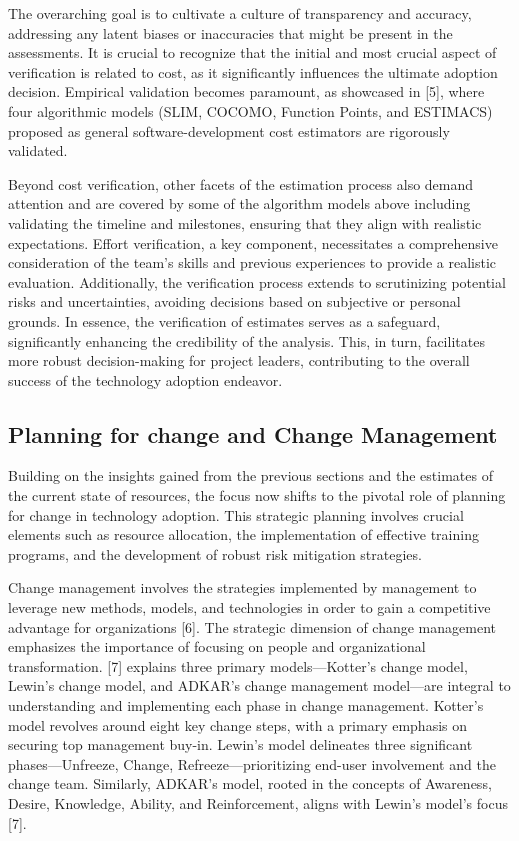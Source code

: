 \documentclass{article}
\begin{document}
\noindent The overarching goal is to cultivate a culture of transparency and accuracy, addressing any latent biases or inaccuracies that might be present in the assessments. It is crucial to recognize that the initial and most crucial aspect of verification is related to cost, as it significantly influences the ultimate adoption decision. Empirical validation becomes paramount, as showcased in [5], where four algorithmic models (SLIM, COCOMO, Function Points, and ESTIMACS) proposed as general software-development cost estimators are rigorously validated.\newline

\noindent Beyond cost verification, other facets of the estimation process also demand attention and are covered by some of the algorithm models above including validating the timeline and milestones, ensuring that they align with realistic expectations. Effort verification, a key component, necessitates a comprehensive consideration of the team's skills and previous experiences to provide a realistic evaluation. Additionally, the verification process extends to scrutinizing potential risks and uncertainties, avoiding decisions based on subjective or personal grounds. In essence, the verification of estimates serves as a safeguard, significantly enhancing the credibility of the analysis. This, in turn, facilitates more robust decision-making for project leaders, contributing to the overall success of the technology adoption endeavor.

\subsection{Planning for change and Change Management}
Building on the insights gained from the previous sections and the estimates of the current state of resources, the focus now shifts to the pivotal role of planning for change in technology adoption. This strategic planning involves crucial elements such as resource allocation, the implementation of effective training programs, and the development of robust risk mitigation strategies. \newline


\noindent Change management involves the strategies implemented by management to leverage new methods, models, and technologies in order to gain a competitive advantage for organizations [6]. The strategic dimension of change management emphasizes the importance of focusing on people and organizational transformation. [7] explains three primary models—Kotter’s change model, Lewin’s change model, and ADKAR’s change management model—are integral to understanding and implementing each phase in change management. Kotter's model revolves around eight key change steps, with a primary emphasis on securing top management buy-in. Lewin's model delineates three significant phases—Unfreeze, Change, Refreeze—prioritizing end-user involvement and the change team. Similarly, ADKAR's model, rooted in the concepts of Awareness, Desire, Knowledge, Ability, and Reinforcement, aligns with Lewin's model's focus [7]. \newline
\end{document}
